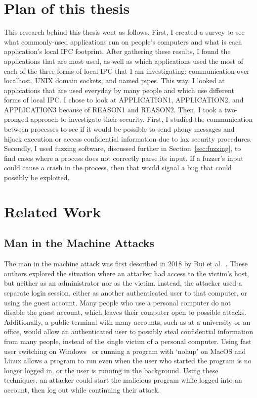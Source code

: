 \section{Plan of this thesis}
This research behind this thesis went as follows.  First, I created a survey to see what commonly-used applications run on people's computers and what is each application's local IPC footprint.  After gathering these results, I found the applications that are most used, as well as which applications used the most of each of the three forms of local IPC that I am investigating: communication over localhost, UNIX domain sockets, and named pipes.  This way, I looked at applications that are used everyday by many people and which use different forms of local IPC.  I chose to look at APPLICATION1, APPLICATION2, and APPLICATION3 because of REASON1 and REASON2.  Then, I took a two-pronged approach to investigate their security.  First, I studied the communication between processes to see if it would be possible to send phony messages and hijack execution or access confidential information due to lax security procedures.  Secondly, I used fuzzing software, discussed further in Section~\ref{sec:fuzzing}, to find cases where a process does not correctly parse its input.  If a fuzzer's input could cause a crash in the process, then that would signal a bug that could possibly be exploited.


\section{Related Work}
\subsection{Man in the Machine Attacks}
The man in the machine attack was first described in 2018 by Bui et al.~\cite{MitMa}.  These authors explored the situation where an attacker had access to the victim's host, but neither as an administrator nor as the victim.  Instead, the attacker used a separate login session, either as another authenticated user to that computer, or using the guest account.  Many people who use a personal computer do not disable the guest account, which leaves their computer open to possible attacks.  Additionally, a public terminal with many accounts, such as at a university or an office, would allow an authenticated user to possibly steal confidential information from many people, instead of the single victim of a personal computer.  Using fast user switching on Windows~\cite{microsoft_developers_network_2018} or running a program with `nohup' on MacOS and Linux allows a program to run even when the user who started the program is no longer logged in, or the user is running in the background.  Using these techniques, an attacker could start the malicious program while logged into an account, then log out while continuing their attack.

